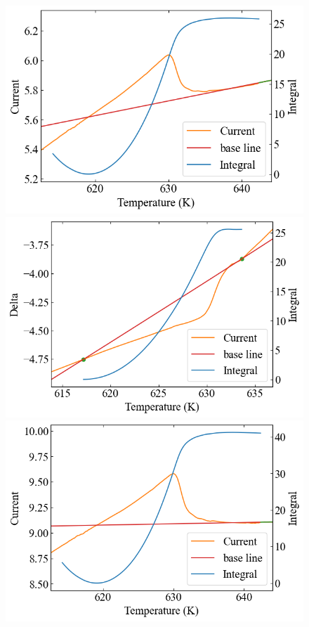 \documentclass[9pt,dvipdfmx,a4paper]{jsarticle}
\begin{document}
\begin{figure}[hbt]
    \begin{minipage}[t]{0.245\columnwidth}
        \centering
        \includegraphics[width = \columnwidth]{appendix/Ni-dHdt-heat.png}
    \end{minipage}
    \hfill
    \begin{minipage}[t]{0.245\columnwidth}
        \centering
        \includegraphics[width = \columnwidth]{appendix/Ni-dHdt-cool.png}
    \end{minipage}
    \hfill
    \begin{minipage}[t]{0.245\columnwidth}
        \centering
        \includegraphics[width = \columnwidth]{appendix/Ni-dSdt-heat.png}

\end{minipage}
\end{figure}
\end{document}

